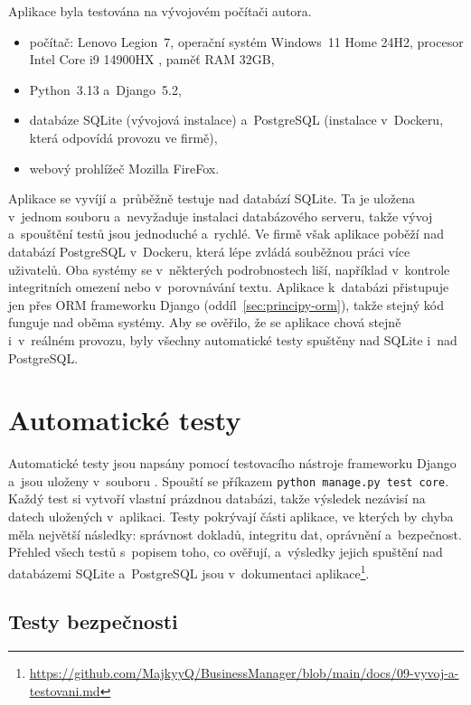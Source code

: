 Aplikace byla testována na vývojovém počítači autora. %
\begin{itemize}
\item počítač: Lenovo Legion~7, operační systém Windows~11 Home 24H2, procesor Intel Core i9 14900HX , paměť RAM 32GB,
\item Python~3.13 a~Django~5.2,
\item databáze SQLite (vývojová instalace) a~PostgreSQL (instalace v~Dockeru, která odpovídá provozu ve firmě),
\item webový prohlížeč Mozilla FireFox.
\end{itemize}

Aplikace se vyvíjí a~průběžně testuje nad databází SQLite. Ta je uložena v~jednom souboru a~nevyžaduje instalaci databázového serveru, takže vývoj a~spouštění testů jsou jednoduché a~rychlé. Ve firmě však aplikace poběží nad databází PostgreSQL v~Dockeru, která lépe zvládá souběžnou práci více uživatelů. Oba systémy se v~některých podrobnostech liší, například v~kontrole integritních omezení nebo v~porovnávání textu. Aplikace k~databázi přistupuje jen přes ORM frameworku Django (oddíl~\ref{sec:principy-orm}), takže stejný kód funguje nad oběma systémy. Aby se ověřilo, že se aplikace chová stejně i~v~reálném provozu, byly všechny automatické testy spuštěny nad SQLite i~nad PostgreSQL.

\section{Automatické testy}\label{sec:testovani-automaticke}

Automatické testy jsou napsány pomocí testovacího nástroje frameworku Django a~jsou uloženy v~souboru . Spouští se příkazem \texttt{python manage.py test core}. Každý test si vytvoří vlastní prázdnou databázi, takže výsledek nezávisí na datech uložených v~aplikaci. Testy pokrývají části aplikace, ve kterých by chyba měla největší následky: správnost dokladů, integritu dat, oprávnění a~bezpečnost. Přehled všech testů s~popisem toho, co ověřují, a~výsledky jejich spuštění nad databázemi SQLite a~PostgreSQL jsou v~dokumentaci aplikace\footnote{\url{https://github.com/MajkyyQ/BusinessManager/blob/main/docs/09-vyvoj-a-testovani.md}}.

\subsection{Testy bezpečnosti}

